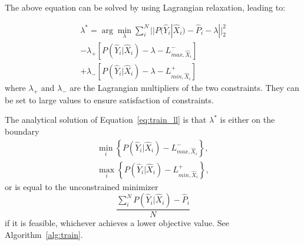 \documentclass[letterpaper]{article} %
\begin{document}

The above equation can be solved by using Lagrangian relaxation, leading to: 

\begin{multline}
\label{eq:train_ll}
\lambda^* = \arg\min_{\lambda}  \sum_i^N ||P(\hat{Y}_i|\hat{X}_i) - \hat{P}_i - \lambda||_2^2 \\
 - \lambda_+ [P(\hat{Y}_i|\hat{X}_i) - \lambda - L^{-}_{max, \hat{X}_i}] \\
 + \lambda_- [ P(\hat{Y}_i|\hat{X}_i) - \lambda  - L^{+}_{min, \hat{X}_i}]
\end{multline}
where $\lambda_+$ and $\lambda_-$ are the Lagrangian multipliers of the two constraints. They can be set to large values to ensure satisfaction of constraints. %
%
%
%
%

The analytical solution of Equation~\ref{eq:train_ll}  is that $\lambda^*$ is either on the boundary
\begin{gather*}
\min_i\left\{P(\hat{Y}_i|\hat{X}_i)-L^{-}_{max, \hat{X}_i}\right\},\\
\max_i\left\{P(\hat{Y}_i|\hat{X}_i)-L^{+}_{min, \hat{X}_i}\right\},
\end{gather*}
or is equal to the unconstrained minimizer
\[
\frac {\sum_i^N  P(\hat{Y}_i|\hat{X}_i) - \hat{P}_i}{N}
\]
if it is feasible, whichever achieves a lower objective value. See Algorithm~\ref{alg:train}.
\end{document}
